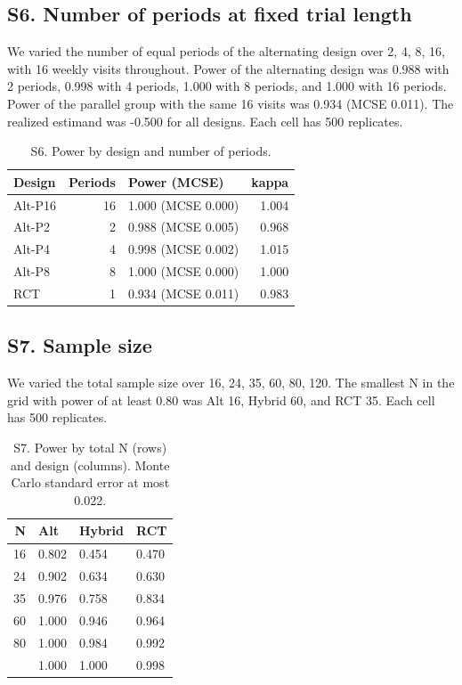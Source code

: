 \documentclass[
  11pt,
]{article}
\begin{document}
\subsection{S6. Number of periods at fixed trial length}\label{s6.-number-of-periods-at-fixed-trial-length}

We varied the number of equal periods of the alternating design over 2, 4, 8, 16, with 16 weekly visits throughout. Power of the alternating design was 0.988 with 2 periods, 0.998 with 4 periods, 1.000 with 8 periods, and 1.000 with 16 periods. Power of the parallel group with the same 16 visits was 0.934 (MCSE 0.011). The realized estimand was -0.500 for all designs. Each cell has 500 replicates.

\begin{table}

\caption{\label{tab:s6-tab}S6. Power by design and number of periods.}
\centering
\begin{tabular}[t]{lrlr}
\toprule
Design & Periods & Power (MCSE) & kappa\\
\midrule
Alt-P16 & 16 & 1.000 (MCSE 0.000) & 1.004\\
Alt-P2 & 2 & 0.988 (MCSE 0.005) & 0.968\\
Alt-P4 & 4 & 0.998 (MCSE 0.002) & 1.015\\
Alt-P8 & 8 & 1.000 (MCSE 0.000) & 1.000\\
RCT & 1 & 0.934 (MCSE 0.011) & 0.983\\
\bottomrule
\end{tabular}
\end{table}

\subsection{S7. Sample size}\label{s7.-sample-size}

We varied the total sample size over 16, 24, 35, 60, 80, 120. The smallest N in the grid with power of at least 0.80 was Alt 16, Hybrid 60, and RCT 35. Each cell has 500 replicates.

\begin{table}

\caption{\label{tab:s7-tab}S7. Power by total N (rows) and design (columns). Monte Carlo standard error at most 0.022.}
\centering
\begin{tabular}[t]{rlll}
\toprule
N & Alt & Hybrid & RCT\\
\midrule
16 & 0.802 & 0.454 & 0.470\\
24 & 0.902 & 0.634 & 0.630\\
35 & 0.976 & 0.758 & 0.834\\
60 & 1.000 & 0.946 & 0.964\\
80 & 1.000 & 0.984 & 0.992\\
\addlinespace
120 & 1.000 & 1.000 & 0.998\\
\bottomrule
\end{tabular}
\end{table}
\end{document}
